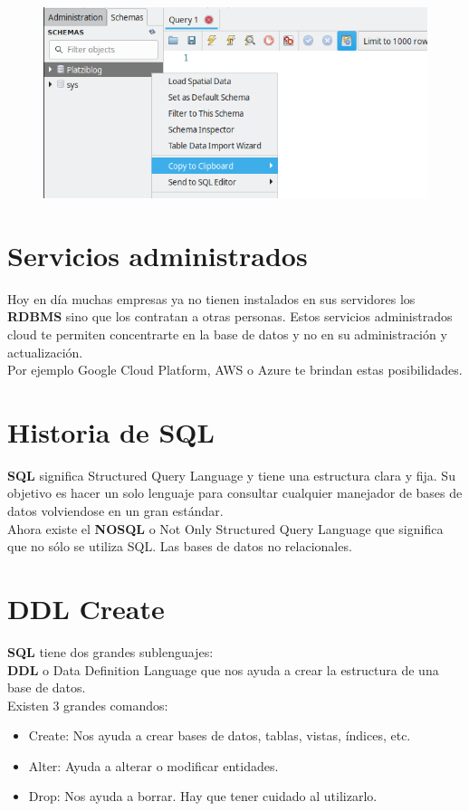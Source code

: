 \documentclass{article}
\begin{document}
\begin{figure}[h!]
  \centering
  \includegraphics[scale=0.65]{./Pictures/041_create_schema.png}
\end{figure}



\section{Servicios administrados}%
Hoy en día muchas empresas ya no tienen instalados en sus servidores los
\textbf{RDBMS} sino que los contratan a otras personas. Estos servicios
administrados cloud te permiten concentrarte en la base de datos y no en su
administración y actualización.\\

Por ejemplo Google Cloud Platform, AWS o Azure te brindan estas posibilidades.

\newpage

\section{Historia de SQL}%
\textbf{SQL} significa Structured Query Language y tiene una estructura clara y
fija. Su objetivo es hacer un solo lenguaje para consultar cualquier manejador
de bases de datos volviendose en un gran estándar.\\

Ahora existe el \textbf{NOSQL} o Not Only Structured Query Language que
significa que no sólo se utiliza SQL. Las bases de datos no relacionales.


\section{DDL Create}%
\textbf{SQL} tiene dos grandes sublenguajes:\\
\textbf{DDL} o Data Definition Language que nos ayuda a crear la estructura de
una base de datos.\\
Existen 3 grandes comandos:
\begin{itemize}
  \item Create: Nos ayuda a crear bases de datos, tablas, vistas, índices, etc.
  \item Alter: Ayuda a alterar o modificar entidades.
  \item Drop: Nos ayuda a borrar. Hay que tener cuidado al utilizarlo.
\end{itemize}
\end{document}
